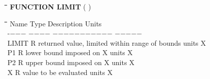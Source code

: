 \documentclass[11pt]{article}
\begin{document}
\bigskip
\nwln
\begin{tabbing}
\hspace{1.27cm}\=\hspace{1.27cm}\=\hspace{1.27cm}\=\hspace{1.27cm}\=%
\hspace{1.27cm}\=\hspace{1.27cm}\=\hspace{1.27cm}\=\hspace{1.27cm}\=%
\hspace{1.27cm}\=\hspace{1.27cm}\=\kill
{\bf FUNCTION LIMIT}\> \> \> ( )
\end{tabbing}
\nwln
\begin{tabbing}
\hspace{1.27cm}\=\hspace{1.27cm}\=\hspace{1.27cm}\=\hspace{1.27cm}\=%
\hspace{1.27cm}\=\hspace{1.27cm}\=\hspace{1.27cm}\=\hspace{1.27cm}\=%
\hspace{1.27cm}\=\hspace{1.27cm}\=\kill
Name    \> \> Type   \> Description                                        \> \> \> \> \> \> \> Units\\
-$-$$-$$-$    \> \> $-$$-$$-$$-$   \> $-$$-$$-$$-$$-$$-$$-$$-$$-$$-$$-$                                        \> \> \> \> \> \> \> $-$$-$$-$$-$$-$\\
LIMIT   \> \> R   \> returned value, limited within range of bounds     \> \> \> \> \> \> \> units X\\
P1      \> \> R   \> lower bound imposed on X                           \> \> \> \> \> \> \> units X\\
P2      \> \> R   \> upper bound imposed on X                           \> \> \> \> \> \> \> units X\\
X       \> \> R   \> value to be evaluated                              \> \> \> \> \> \> \> units X
\end{tabbing}
\end{document}
